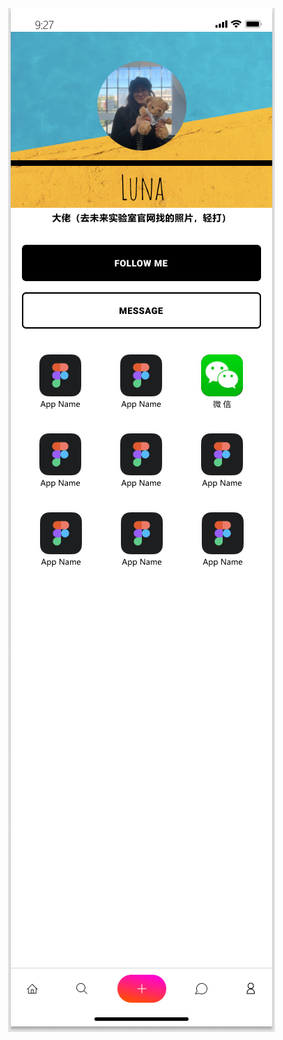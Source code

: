 \documentclass[UTF8]{ctexart}
\begin{document}
\begin{figure}[htbp]
{\begin{minipage}[b]{.3\linewidth}
            \includegraphics[scale=0.3]{ViewHomePage.png}
        \end{minipage}
    }
\end{figure}
\end{document}
